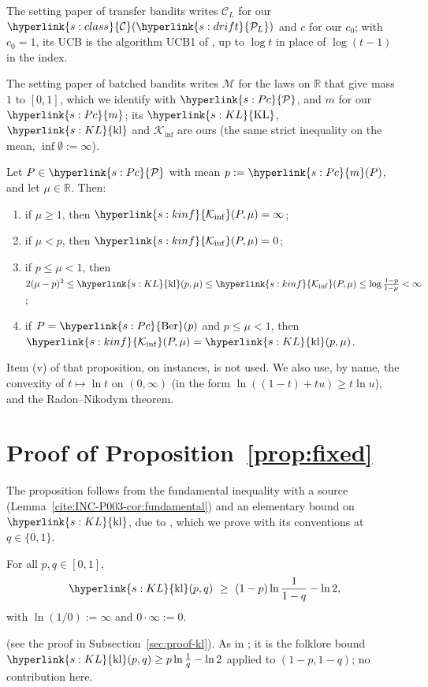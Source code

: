 \documentclass[11pt]{article}
\newcommand{\sy}[2]{\hyperlink{#1}{#2}}
\newcommand{\R}{\mathbb{R}}
\newcommand{\Pc}{\sy{s:Pc}{\mathcal{P}}}
\newcommand{\m}{\sy{s:Pc}{m}}
\newcommand{\Ber}{\sy{s:Pc}{\mathrm{Ber}}}
\newcommand{\KL}{\sy{s:KL}{\mathrm{KL}}}
\newcommand{\kl}{\sy{s:KL}{\mathrm{kl}}}
\newcommand{\Kinf}{\sy{s:kinf}{\mathcal{K}_{\inf}}}
\newcommand{\PcL}{\sy{s:drift}{\mathcal{P}_{L}}}
\newcommand{\Cl}{\sy{s:class}{\mathcal{C}}}
\begin{document}
The setting paper of transfer bandits \citep{INC-P003} writes $\mathcal C_L$ for our $\Cl(\PcL)$ and $c$ for our $c_0$;
with $c_0=1$, its UCB is the algorithm UCB1 of \citet[Figure~1]{ACF02}, up to $\log t$ in
place of $\log(t-1)$ in the index.

The setting paper of batched bandits \citep{INC-P006} writes $\mathcal M$ for the laws on $\R$ that
give mass $1$ to $[0,1]$, which we identify with $\Pc$, and $m$ for our $\m$; its $\KL$, $\kl$ and
$\mathcal K_{\inf}$ are ours (the same strict inequality on the mean, $\inf\emptyset:=\infty$).

\begin{lemma}\label{cite:INC-P006-prop:kinf}
Let $P\in\Pc$ with mean $p:=\m(P)$, and let $\mu\in\R$. Then:
\begin{enumerate}[label=(\roman*)]
\item if $\mu\ge1$, then $\Kinf(P,\mu)=\infty$;
\item if $\mu<p$, then $\Kinf(P,\mu)=0$;
\item if $p\le\mu<1$, then
$2(\mu-p)^2\le\kl(p,\mu)\le\Kinf(P,\mu)\le\log\frac{1-p}{1-\mu}<\infty$;
\item if $P=\Ber(p)$ and $p\le\mu<1$, then $\Kinf(P,\mu)=\kl(p,\mu)$.
\end{enumerate}
\end{lemma}

Item (v) of that proposition, on instances, is not used. We also use, by name,
the convexity of $t\mapsto\ln t$ on $(0,\infty)$ (in the form $\ln((1-t)+tu)\ge t\ln u$), and the
Radon--Nikodym theorem.

\section{Proof of Proposition~\ref{prop:fixed}}\label{sec:proof-fixed}

The proposition follows from the fundamental inequality with a source
(Lemma~\ref{cite:INC-P003-cor:fundamental}) and an elementary bound on $\kl$, due to
\citet[(10)--(11)]{GMS19}, which we prove with its conventions at $q\in\{0,1\}$.

\begin{lemma}\label{lem:kl}
For all $p,q\in[0,1]$,
\begin{equation*}
\kl(p,q)\ \ge\ (1-p)\ln\frac{1}{1-q}-\ln2,
\end{equation*}
with $\ln(1/0):=\infty$ and $0\cdot\infty:=0$.
\end{lemma}
(see the proof in Subsection~\ref{sec:proof-kl}). As in \citet[(10)--(11)]{GMS19}; it is the folklore bound $\kl(p,q)\ge p\ln\frac1q-\ln2$
\citep[(10) and Section~7]{GMS20} applied to $(1-p,1-q)$; no contribution here.
\end{document}
